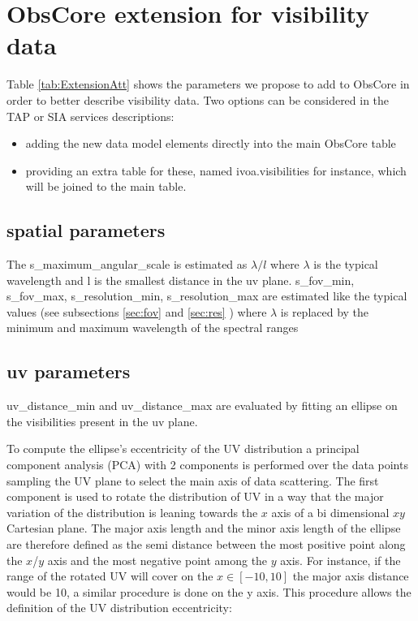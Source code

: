 \documentclass[11pt,a4paper]{ivoa}
\begin{document}
\section{ObsCore extension for visibility data}

Table \ref{tab:ExtensionAtt} shows the %
parameters we propose to add to ObsCore in order to better describe visibility data.
Two options can be considered in the TAP or SIA services descriptions: 
\begin{itemize}
\item adding the new data model elements directly into the main ObsCore table
\item providing an extra table for these, named ivoa.visibilities for instance,  which will be joined to the main table. 
\end{itemize}

\subsection{spatial parameters}

The s\_maximum\_angular\_scale is estimated as $\lambda/l$ where $\lambda$ is the typical wavelength and l is the smallest distance in the uv plane. s\_fov\_min, s\_fov\_max, s\_resolution\_min, s\_resolution\_max are estimated like the typical values (see subsections \ref{sec:fov} and \ref{sec:res} ) where $\lambda$ is replaced by the minimum and maximum wavelength of the spectral ranges


\subsection{uv parameters}

uv\_distance\_min and uv\_distance\_max are evaluated by fitting an ellipse on the visibilities present in the uv plane.

To compute the ellipse's eccentricity of the UV distribution a principal component analysis (PCA) with 2 components is performed over the data points sampling the UV plane to select the main axis of data scattering. 
The first component is used to rotate the distribution of UV in a way that the major variation of the distribution is leaning towards the $x$ axis of a bi dimensional $xy$ Cartesian plane. The major axis length and the minor axis length of the ellipse are therefore defined as the semi distance between the most positive point along the $x$/$y$ axis and the most negative point among the $y$ axis. For instance, if the range of the rotated UV will cover on the $x \in [-10, 10]$ the major axis distance would be 10, a similar procedure is done on the y axis. This procedure allows the definition of the UV distribution eccentricity:
\end{document}
